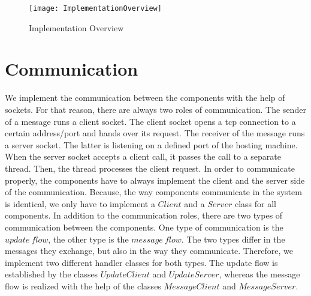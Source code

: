 \documentclass[11pt,a4paper,bibtotoc,idxtotoc,headsepline,footsepline,footexclude,BCOR12mm,DIV13]{scrbook}
\begin{document}
\begin{figure}[h!]
  
  \centering
    \texttt{[image: ImplementationOverview]}
    \caption{Implementation Overview}
    \label{fig:implementationoverview}
\end{figure}


\section{Communication}

We implement the communication between the components with the help of sockets. For that reason, there are always two roles of communication. The sender of a message runs a client socket. The client socket opens a tcp connection to a certain address/port and hands over its request. The receiver of the message runs a server socket. The latter is listening on a defined port of the hosting machine. When the server socket accepts a client call, it passes the call to a separate thread. Then, the thread processes the client request. In order to communicate properly, the components have to always implement the client and the server side of the communication. Because, the way components communicate in the system is identical, we only have to implement a $Client$ and a $Server$ class for all components. In addition to the communication roles, there are two types of communication between the components. One type of communication is the $update\:flow$, the other type is the $message\:flow$. The two types differ in the messages they exchange, but also in the way they communicate. Therefore, we implement two different handler classes for both types. The update flow is established by the classes $UpdateClient$ and $UpdateServer$, whereas the message flow is realized with the help of the classes $MessageClient$ and $MessageServer$. 
\end{document}
